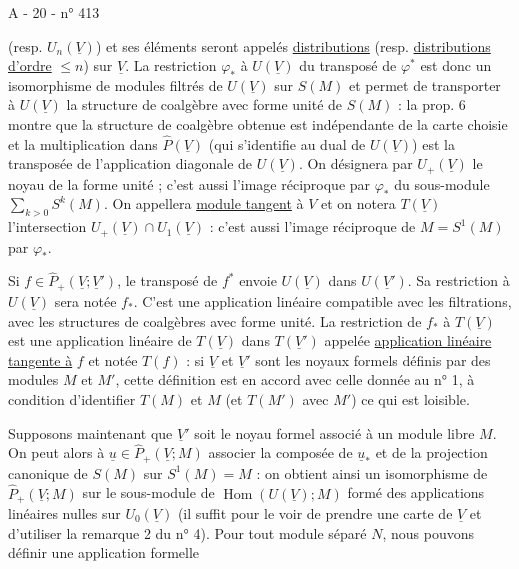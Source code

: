 A - 20 - \hfill n° 413

(resp. $U_n(\underline V)$) et ses éléments seront appelés \uline{distributions} (resp. \uline{distributions d'ordre} $\leq n$) sur $\underline V$. La restriction $\varphi_*$ à $U(\underline V)$ du transposé de $\varphi^*$ est donc un isomorphisme de modules filtrés de $U(\underline V)$ sur $S(M)$ et permet de transporter à $U(\underline V)$ la structure de coalgèbre avec forme unité de $S(M)$ : la prop. 6 montre que la structure de coalgèbre obtenue est indépendante de la carte choisie et la multiplication dans $\widehat P(\underline V)$ (qui s'identifie au dual de $U(\underline V)$) est la transposée de l'application diagonale de $U(\underline V)$. On désignera par $U_+(\underline V)$ le noyau de la forme unité ; c'est aussi l'image réciproque par $\varphi_*$ du sous-module $\displaystyle\sum_{k>0}S^k(M)$. On appellera \uline{module tangent} à $V$ et on notera $T(\underline V)$ l'intersection $U_+(\underline V)\cap U_1(\underline V)$ : c'est aussi l'image réciproque de $M=S^1(M)$ par $\varphi_*$.

Si $f\in\widehat P_+(\underline V;\underline V')$, le transposé de $f^*$ envoie $U(\underline V)$ dans $U(\underline V')$. Sa restriction à $U(\underline V)$ sera notée $f_*$. C'est une application linéaire compatible avec les filtrations, avec les structures de coalgèbres avec forme unité. La restriction de $f_*$ à $T(\underline V)$ est une application linéaire de $T(\underline V)$ dans $T(\underline V')$ appelée \uline{application linéaire tangente à} $f$ et notée $T(f)$ : si $\underline V$ et $\underline V'$ sont les noyaux formels définis par des modules $M$ et $M'$, cette définition est en accord avec celle donnée au n° 1, à condition d'identifier $T(M)$ et $M$ (et $T(M')$ avec $M'$) ce qui est loisible.

Supposons maintenant que $\underline V'$ soit le noyau formel associé à un module libre $M$. On peut alors à $\underline u\in\widehat P_+(\underline V;M)$ associer la composée de $\underline u_*$ et de la projection canonique de $S(M)$ sur $S^1(M)=M$ : on obtient ainsi un isomorphisme de $\widehat P_+(\underline V;M)$ sur le sous-module de $\operatorname{Hom}(U(\underline V);M)$ formé des applications linéaires nulles sur $U_0(\underline V)$ (il suffit pour le voir de prendre une carte de $\underline V$ et d'utiliser la remarque 2 du n° 4). Pour tout module séparé $N$, nous pouvons définir une application formelle


